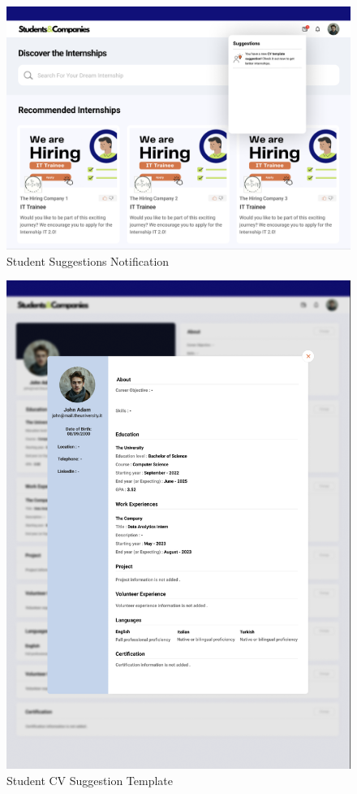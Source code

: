 \documentclass{article}
\begin{document}
\begin{figure}[H]
    \centering
    \includegraphics[scale = 0.42]{figures/UserInterfaces/Student/SuggestionNotification.png}
    \caption{Student Suggestions Notification}
     \centering
\end{figure}
\begin{figure}[H]
    \centering
    \includegraphics[scale = 0.65]{figures/UserInterfaces/Student/CVSuggestion.png}
    \caption{Student CV Suggestion Template}
     \centering
\end{figure}
\end{document}
